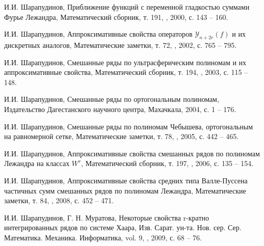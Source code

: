 \begin{thebibliography}{999}


И.И. Шарапудинов,
Приближение функций с переменной гладкостью суммами Фурье Лежандра,
Математический сборник, т. 191, , 2000, с. 143 -- 160.






И.И. Шарапудинов,
Аппроксимативные свойства операторов $\mathcal{Y}_{n+2r}(f)$ и их дискретных аналогов,
Математические заметки, т. 72, , 2002, с. 765 -- 795.





И.И. Шарапудинов,
Смешанные ряды по ультрасферическим полиномам и их аппроксимативные свойства,
Математический сборник, т. 194, , 2003, с. 115 -- 148.





И.И. Шарапудинов,
Смешанные ряды по ортогональным полиномам,
Издательство Дагестанского научного центра, Махачкала, 2004, с. 1 -- 176.






И.И. Шарапудинов,
Смешанные ряды по полиномам Чебышева, ортогональным на равномерной сетке,
Математические заметки, т. 78, , 2005, с. 442 -- 465.






И.И. Шарапудинов,
Аппроксимативные свойства смешанных рядов по полиномам Лежандра на классах $W^r$,
Математический сборник, т. 197, , 2006, с. 135 -- 154.





И.И. Шарапудинов,
Аппроксимативные свойства средних типа Валле-Пуссена частичных сумм смешанных рядов по полиномам Лежандра,
Математические заметки, т. 84, , 2008, с. 452 -- 471.





 И.И. Шарапудинов,  Г. Н. Муратова,
Некоторые свойства r-кратно интегрированных рядов по системе Хаара,
Изв. Сарат. ун-та. Нов. сер. Сер. Математика. Механика. Информатика, vol. 9, , 2009, с. 68 -- 76.




\end{thebibliography}
